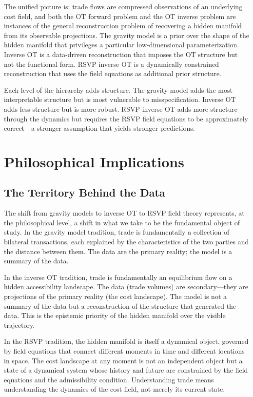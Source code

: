 \documentclass[12pt]{article}
\begin{document}
The unified picture is: trade flows are compressed observations of an underlying cost field, and both the OT forward problem and the OT inverse problem are instances of the general reconstruction problem of recovering a hidden manifold from its observable projections. The gravity model is a prior over the shape of the hidden manifold that privileges a particular low-dimensional parameterization. Inverse OT is a data-driven reconstruction that imposes the OT structure but not the functional form. RSVP inverse OT is a dynamically constrained reconstruction that uses the field equations as additional prior structure.

Each level of the hierarchy adds structure. The gravity model adds the most interpretable structure but is most vulnerable to misspecification. Inverse OT adds less structure but is more robust. RSVP inverse OT adds more structure through the dynamics but requires the RSVP field equations to be approximately correct---a stronger assumption that yields stronger predictions.

\section{Philosophical Implications}

\subsection{The Territory Behind the Data}

The shift from gravity models to inverse OT to RSVP field theory represents, at the philosophical level, a shift in what we take to be the fundamental object of study. In the gravity model tradition, trade is fundamentally a collection of bilateral transactions, each explained by the characteristics of the two parties and the distance between them. The data are the primary reality; the model is a summary of the data.

In the inverse OT tradition, trade is fundamentally an equilibrium flow on a hidden accessibility landscape. The data (trade volumes) are secondary---they are projections of the primary reality (the cost landscape). The model is not a summary of the data but a reconstruction of the structure that generated the data. This is the epistemic priority of the hidden manifold over the visible trajectory.

In the RSVP tradition, the hidden manifold is itself a dynamical object, governed by field equations that connect different moments in time and different locations in space. The cost landscape at any moment is not an independent object but a state of a dynamical system whose history and future are constrained by the field equations and the admissibility condition. Understanding trade means understanding the dynamics of the cost field, not merely its current state.
\end{document}
